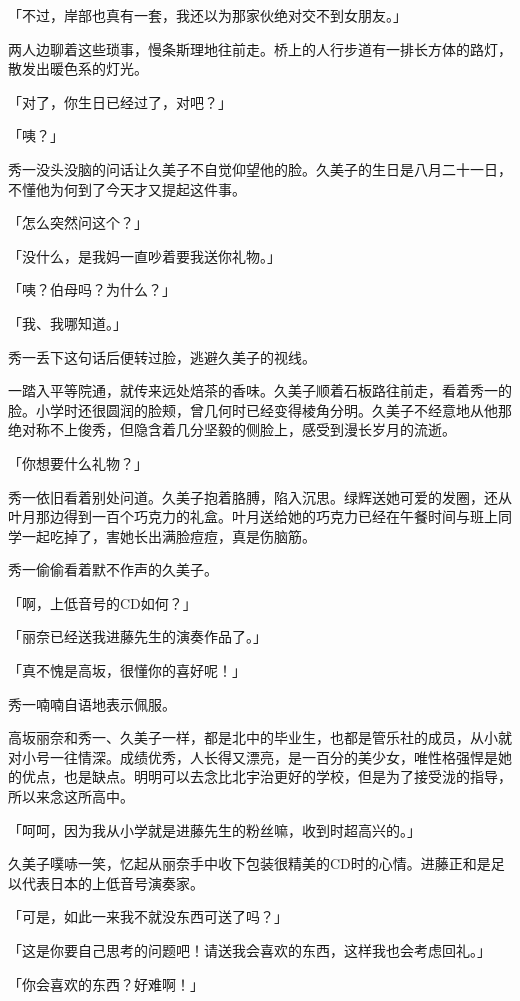 \documentclass[UTF8]{ctexart}
\begin{document}
    「不过，岸部也真有一套，我还以为那家伙绝对交不到女朋友。」 

    两人边聊着这些琐事，慢条斯理地往前走。桥上的人行步道有一排长方体的路灯，散发出暖色系的灯光。 

    「对了，你生日已经过了，对吧？」 

    「咦？」 

    秀一没头没脑的问话让久美子不自觉仰望他的脸。久美子的生日是八月二十一日，不懂他为何到了今天才又提起这件事。 

    「怎么突然问这个？」 

    「没什么，是我妈一直吵着要我送你礼物。」 

    「咦？伯母吗？为什么？」 

    「我、我哪知道。」 

    秀一丢下这句话后便转过脸，逃避久美子的视线。 

    一踏入平等院通，就传来远处焙茶的香味。久美子顺着石板路往前走，看着秀一的脸。小学时还很圆润的脸颊，曾几何时已经变得棱角分明。久美子不经意地从他那绝对称不上俊秀，但隐含着几分坚毅的侧脸上，感受到漫长岁月的流逝。 

    「你想要什么礼物？」 

    秀一依旧看着别处问道。久美子抱着胳膊，陷入沉思。绿辉送她可爱的发圈，还从叶月那边得到一百个巧克力的礼盒。叶月送给她的巧克力已经在午餐时间与班上同学一起吃掉了，害她长出满脸痘痘，真是伤脑筋。 

    秀一偷偷看着默不作声的久美子。 

    「啊，上低音号的CD如何？」 

    「丽奈已经送我进藤先生的演奏作品了。」 

    「真不愧是高坂，很懂你的喜好呢！」 

    秀一喃喃自语地表示佩服。 

    高坂丽奈和秀一、久美子一样，都是北中的毕业生，也都是管乐社的成员，从小就对小号一往情深。成绩优秀，人长得又漂亮，是一百分的美少女，唯性格强悍是她的优点，也是缺点。明明可以去念比北宇治更好的学校，但是为了接受泷的指导，所以来念这所高中。 

    「呵呵，因为我从小学就是进藤先生的粉丝嘛，收到时超高兴的。」 

    久美子噗哧一笑，忆起从丽奈手中收下包装很精美的CD时的心情。进藤正和是足以代表日本的上低音号演奏家。 

    「可是，如此一来我不就没东西可送了吗？」 

    「这是你要自己思考的问题吧！请送我会喜欢的东西，这样我也会考虑回礼。」 

    「你会喜欢的东西？好难啊！」 
\end{document}
